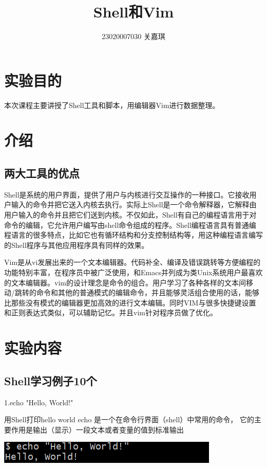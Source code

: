 \documentclass{article}
\title{Shell和Vim}
\author{23020007030  关嘉琪}
\begin{document}
	
	\maketitle
	
	\section{实验目的}
	本次课程主要讲授了Shell工具和脚本，用编辑器Vim进行数据整理。
	
	\section{介绍}
	\subsection{两大工具的优点}
	Shell是系统的用户界面，提供了用户与内核进行交互操作的一种接口。它接收用户输入的命令并把它送入内核去执行。实际上Shell是一个命令解释器，它解释由用户输入的命令并且把它们送到内核。不仅如此，Shell有自己的编程语言用于对命令的编辑，它允许用户编写由shell命令组成的程序。Shell编程语言具有普通编程语言的很多特点，比如它也有循环结构和分支控制结构等，用这种编程语言编写的Shell程序与其他应用程序具有同样的效果。
	
	Vim是从vi发展出来的一个文本编辑器。代码补全、编译及错误跳转等方便编程的功能特别丰富，在程序员中被广泛使用，和Emacs并列成为类Unix系统用户最喜欢的文本编辑器。vim的设计理念是命令的组合。用户学习了各种各样的文本间移动/跳转的命令和其他的普通模式的编辑命令，并且能够灵活组合使用的话，能够比那些没有模式的编辑器更加高效的进行文本编辑。同时VIM与很多快捷键设置和正则表达式类似，可以辅助记忆。并且vim针对程序员做了优化。
	\section{实验内容}
	\subsection{Shell学习例子10个}
	
	1.echo "Hello, World!"
	
	用Shell打印hello world
	echo 是一个在命令行界面（shell）中常用的命令，
	它的主要作用是输出（显示）一段文本或者变量的值到标准输出
	
	\noindent
	\begin{minipage}{\linewidth}
		\centering
		\includegraphics[width=0.5\linewidth]{example1.png}
		\label{fig:example}
	\end{minipage}
	
\end{document}
